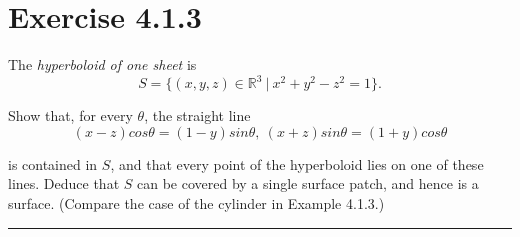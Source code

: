 \documentclass[12pt]{article}
\begin{document}
\maketitle

\section*{Exercise 4.1.3}

The \emph{hyperboloid of one sheet} is
$$
S = \lbrace \left( x,y,z \right) \in \mathbb{R}^3 \ \vert \ x^2 + y^2 - z^2 = 1  \rbrace.
$$

Show that, for every $\theta$, the straight line
$$
(x-z)cos\theta = (1-y)sin\theta,  \ (x+z)sin\theta = (1+y)cos\theta
$$

is contained in $S$, and that every point of the hyperboloid lies on one of these lines. Deduce that $S$ can be covered by a single surface patch, and hence is a surface. (Compare the case of the cylinder in Example 4.1.3.)

\vspace{1cm}
\hrule
\vspace{1cm}
\end{document}
